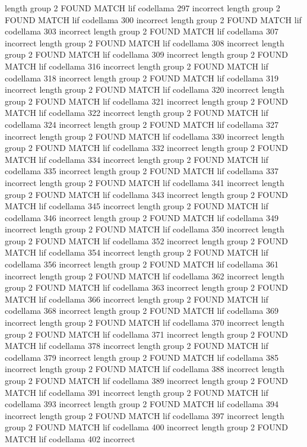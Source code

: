 length group  2
FOUND MATCH lif codellama 297 incorrect
length group  2
FOUND MATCH lif codellama 300 incorrect
length group  2
FOUND MATCH lif codellama 303 incorrect
length group  2
FOUND MATCH lif codellama 307 incorrect
length group  2
FOUND MATCH lif codellama 308 incorrect
length group  2
FOUND MATCH lif codellama 309 incorrect
length group  2
FOUND MATCH lif codellama 316 incorrect
length group  2
FOUND MATCH lif codellama 318 incorrect
length group  2
FOUND MATCH lif codellama 319 incorrect
length group  2
FOUND MATCH lif codellama 320 incorrect
length group  2
FOUND MATCH lif codellama 321 incorrect
length group  2
FOUND MATCH lif codellama 322 incorrect
length group  2
FOUND MATCH lif codellama 324 incorrect
length group  2
FOUND MATCH lif codellama 327 incorrect
length group  2
FOUND MATCH lif codellama 330 incorrect
length group  2
FOUND MATCH lif codellama 332 incorrect
length group  2
FOUND MATCH lif codellama 334 incorrect
length group  2
FOUND MATCH lif codellama 335 incorrect
length group  2
FOUND MATCH lif codellama 337 incorrect
length group  2
FOUND MATCH lif codellama 341 incorrect
length group  2
FOUND MATCH lif codellama 343 incorrect
length group  2
FOUND MATCH lif codellama 345 incorrect
length group  2
FOUND MATCH lif codellama 346 incorrect
length group  2
FOUND MATCH lif codellama 349 incorrect
length group  2
FOUND MATCH lif codellama 350 incorrect
length group  2
FOUND MATCH lif codellama 352 incorrect
length group  2
FOUND MATCH lif codellama 354 incorrect
length group  2
FOUND MATCH lif codellama 356 incorrect
length group  2
FOUND MATCH lif codellama 361 incorrect
length group  2
FOUND MATCH lif codellama 362 incorrect
length group  2
FOUND MATCH lif codellama 363 incorrect
length group  2
FOUND MATCH lif codellama 366 incorrect
length group  2
FOUND MATCH lif codellama 368 incorrect
length group  2
FOUND MATCH lif codellama 369 incorrect
length group  2
FOUND MATCH lif codellama 370 incorrect
length group  2
FOUND MATCH lif codellama 371 incorrect
length group  2
FOUND MATCH lif codellama 378 incorrect
length group  2
FOUND MATCH lif codellama 379 incorrect
length group  2
FOUND MATCH lif codellama 385 incorrect
length group  2
FOUND MATCH lif codellama 388 incorrect
length group  2
FOUND MATCH lif codellama 389 incorrect
length group  2
FOUND MATCH lif codellama 391 incorrect
length group  2
FOUND MATCH lif codellama 393 incorrect
length group  2
FOUND MATCH lif codellama 394 incorrect
length group  2
FOUND MATCH lif codellama 397 incorrect
length group  2
FOUND MATCH lif codellama 400 incorrect
length group  2
FOUND MATCH lif codellama 402 incorrect
